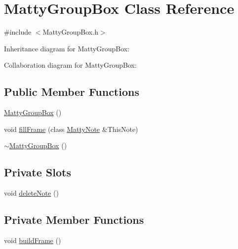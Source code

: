 \hypertarget{classMattyGroupBox}{}\section{Matty\+Group\+Box Class Reference}
\label{classMattyGroupBox}


{\ttfamily \#include $<$Matty\+Group\+Box.\+h$>$}



Inheritance diagram for Matty\+Group\+Box\+:


Collaboration diagram for Matty\+Group\+Box\+:
\subsection*{Public Member Functions}
\begin{DoxyCompactItemize}
\item 
\hyperlink{classMattyGroupBox_aa44b29a1b8b8f5129f52c2972c24aecd}{Matty\+Group\+Box} ()
\item 
void \hyperlink{classMattyGroupBox_a4cbc1800e9ec63cdd0e064d3a3738b80}{fill\+Frame} (class \hyperlink{classMattyNote}{Matty\+Note} \&This\+Note)
\item 
\hyperlink{classMattyGroupBox_acf5f5023cf210a83e9846a35b149dd70}{$\sim$\+Matty\+Group\+Box} ()
\end{DoxyCompactItemize}
\subsection*{Private Slots}
\begin{DoxyCompactItemize}
\item 
void \hyperlink{classMattyGroupBox_ac7b7f1db6ea96e4c4b0f58fb87f86900}{delete\+Note} ()
\end{DoxyCompactItemize}
\subsection*{Private Member Functions}
\begin{DoxyCompactItemize}
\item 
void \hyperlink{classMattyGroupBox_ae9862aae672bd2cf4a99da541beef696}{build\+Frame} ()
\end{DoxyCompactItemize}
